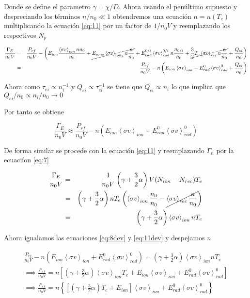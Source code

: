 \documentclass[11pt]{article}
\theoremstyle{definition}
\begin{document}
  Donde se define el parametro $\gamma = \chi/D$. Ahora usando el pen\'ultimo supuesto y despreciando los t\'erminos $n/n_0 \ll 1$ obtendremos una ecuaci\'on $n = n(T_e)$ multiplicando la ecuaci\'on \eqref{eq:11} por un factor de $1/n_0 V$ y reemplazando los respectivos $N_p$

  \begin{eqnarray*}
    \frac{\Gamma_E}{n_0V} &=& \frac{P_{rf}}{n_0V} - \left(E_{ion}\frac{\left<\sigma v\right>_{ion} nn_0 }{n_0 } +\cancel{E_{ion_2}\left<\sigma v\right>_{ion_2} n \frac{n}{n_0} } + E_{rad}^{0/i}\left<\sigma v\right>_{rad}^{0/i}n \frac{n_{0/i}}{n_0} + \cancel{\frac{3}{2}T_e\left<\sigma v\right>_{rec}n \frac{n}{n_0} } + \frac{Q_{ei}}{n_0} \right) \nonumber\\
                          &=& \frac{P_{rf}}{n_0V} -n \left(E_{ion}\left<\sigma v\right>_{ion} + E_{rad}^0\left<\sigma v\right>_{rad}^0 + \frac{Q_{ei}}{n_0}\right) 
  \end{eqnarray*}

  Ahora como $\tau_{ei} \propto n_i^{-1}$ y $Q_{ei} \propto \tau_{ei}^{-1}$ se tiene que $Q_{ei} \propto n_i$ lo que implica que $Q_{ei}/n_0 \propto n_i/n_0 \rightarrow 0$
  
  Por tanto se obtiene
  
  \begin{equation}\label{eq:8dev}
    \frac{\Gamma_{E}}{n_0V} \approx \frac{P_{rf}}{n_0V} -n (E_{ion}\left<\sigma v\right>_{ion} + E_{rad}^0\left<\sigma v\right>_{rad}^0)
  \end{equation}

  De forma similar se procede con la ecuaci\'on \eqref{eq:11} y reemplazando $\Gamma_n$ por la ecuaci\'ion \eqref{eq:7}

  \begin{eqnarray}\label{eq:11dev}
    \frac{\Gamma_E}{n_0 V} &=& \frac{1}{n_0V} \left(\gamma + \frac{3}{2}\alpha\right)V(N_{ion} - N_{rec})T_e \nonumber\\
                           &=& \left(\gamma + \frac{3}{2}\alpha\right)nT_e \left(\left<\sigma v\right>_{ion}\frac{n_0}{n_0} - \cancel{\left<\sigma v\right>_{rec}\frac{n}{n_0}}\right) \nonumber \\
                           &=& \left(\gamma + \frac{3}{2}\alpha\right)\left<\sigma v\right>_{ion}nT_e
  \end{eqnarray}

  Ahora igualamos las ecuaciones \eqref{eq:8dev} y \eqref{eq:11dev} y despejamos $n$

  \begin{eqnarray*}
    \frac{P_{rf}}{n_0V} -n (E_{ion}\left<\sigma v\right>_{ion} + E_{rad}^0\left<\sigma v\right>_{rad}^0) = \left(\gamma + \frac{3}{2}\alpha\right)\left<\sigma v\right>_{ion}nT_e \\ \implies \frac{P_{rf}}{n_0V} = n \left[\left(\gamma + \frac{3}{2}\alpha\right)\left<\sigma v\right>_{ion}T_e + E_{ion}\left<\sigma v\right>_{ion} + E_{rad}^0\left<\sigma v\right>_{rad}^0\right] \\
    \implies \frac{ P_{rf} }{n_0V} = n \left\{ \left[ \left(\gamma + \frac{3}{2}\alpha\right)T_e + E_{ion}\right] \left<\sigma v\right>_{ion} + E_{rad}^0\left<\sigma v\right>_{rad}^0 \right\}
  \end{eqnarray*}
\end{document}
